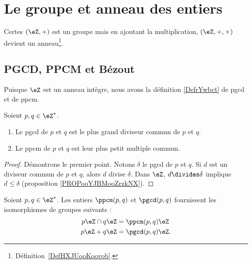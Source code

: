 \section{Le groupe et anneau des entiers}

Certes \( (\eZ,+)\) est un groupe mais en ajoutant la multiplication, \( (\eZ,+,\times)\) devient un anneau\footnote{Définition~\ref{DefHXJUooKoovob}.}.


\subsection{PGCD, PPCM et Bézout}

Puisque \( \eZ\) est un anneau intègre, nous avons la définition \ref{DefrYwbct} de pgcd et de ppcm.
\begin{proposition}       \label{PROPooAVRGooUfhjwF}
	Soient \( p,q\in\eZ^*\).
	\begin{enumerate}
		\item
		      Le pgcd de \( p\) et \( q\) est le plus grand diviseur commun de \( p\) et \( q\).
		\item
		      Le ppcm de \( p\) et \( q\) est leur plus petit multiple commun.
	\end{enumerate}
\end{proposition}

\begin{proof}
	Démontrons le premier point. Notons \( \delta\) le pgcd de \( p\) et \( q\). Si \( d\) est un diviseur commun de \( p\) et \( q\), alors \( d\) divise \( \delta\). Dans \( \eZ\), \( d\divides \delta\) implique \( d\leq\delta\) (proposition \ref{PROPooYJBMooZrzkNX}).
\end{proof}

\begin{lemma}
	Soient \( p,q\in\eZ^*\). Les entiers \( \ppcm(p,q)\) et \( \pgcd(p,q)\) fournissent les isomorphismes de groupes suivants :
	\begin{subequations}
		\begin{align}
			p\eZ\cap q\eZ & =\ppcm(p,q)\eZ  \\
			p\eZ + q\eZ   & =\pgcd(p,q)\eZ.
		\end{align}
	\end{subequations}
\end{lemma}

